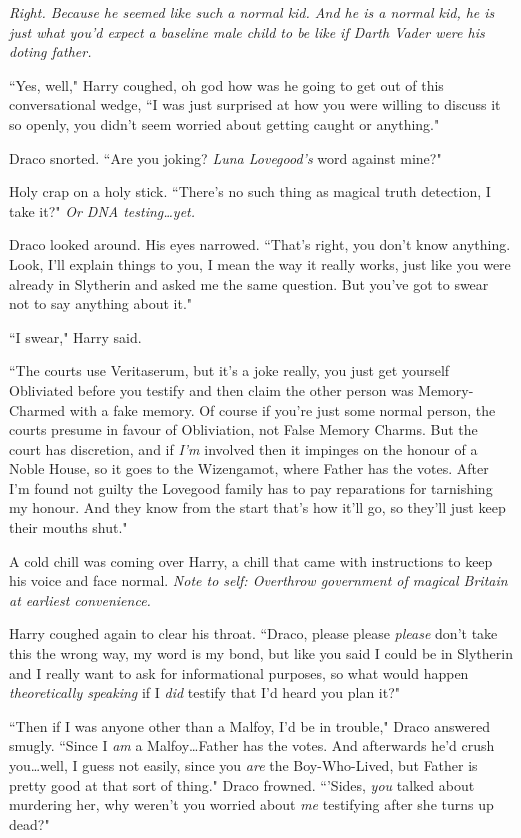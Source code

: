 \emph{Right. Because he \emph{seemed} like such a normal kid. And he \emph{is} a normal kid, he is just what you'd \emph{expect} a baseline male child to be like if Darth Vader were his doting father.}

``Yes, well," Harry coughed, oh god how was he going to get out of this conversational wedge, ``I was just surprised at how you were willing to discuss it so openly, you didn't seem worried about getting caught or anything."

Draco snorted. ``Are you joking? \emph{Luna Lovegood's} word against mine?"

Holy crap on a holy stick. ``There's no such thing as magical truth detection, I take it?" \emph{Or DNA testing…yet.}

Draco looked around. His eyes narrowed. ``That's right, you don't know anything. Look, I'll explain things to you, I mean the way it really works, just like you were already in Slytherin and asked me the same question. But you've got to swear not to say anything about it."

``I swear," Harry said.

``The courts use Veritaserum, but it's a joke really, you just get yourself Obliviated before you testify and then claim the other person was Memory-Charmed with a fake memory. Of course if you're just some normal person, the courts presume in favour of Obliviation, not False Memory Charms. But the court has discretion, and if \emph{I'm} involved then it impinges on the honour of a Noble House, so it goes to the Wizengamot, where Father has the votes. After I'm found not guilty the Lovegood family has to pay reparations for tarnishing my honour. And they know from the start that's how it'll go, so they'll just keep their mouths shut."

A cold chill was coming over Harry, a chill that came with instructions to keep his voice and face normal. \emph{Note to self: Overthrow government of magical Britain at earliest convenience.}

Harry coughed again to clear his throat. ``Draco, please please \emph{please} don't take this the wrong way, my word is my bond, but like you said I could be in Slytherin and I really want to ask for informational purposes, so what would happen \emph{theoretically speaking} if I \emph{did} testify that I'd heard you plan it?"

``Then if I was anyone other than a Malfoy, I'd be in trouble," Draco answered smugly. ``Since I \emph{am} a Malfoy…Father has the votes. And afterwards he'd crush you…well, I guess not easily, since you \emph{are} the Boy-Who-Lived, but Father is pretty good at that sort of thing." Draco frowned. ``'Sides, \emph{you} talked about murdering her, why weren't you worried about \emph{me} testifying after she turns up dead?"

